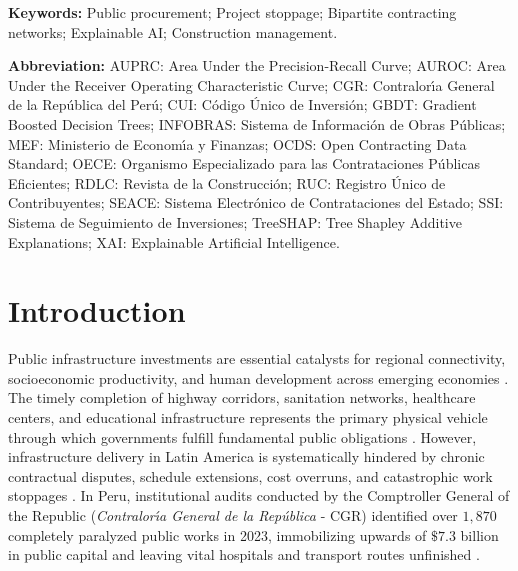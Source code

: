 \documentclass[10pt,a4paper]{article}
\begin{document}
\noindent\textbf{Keywords:} Public procurement; Project stoppage; Bipartite contracting networks; Explainable AI; Construction management.
\vspace{0.2cm}

\noindent\textbf{Abbreviation:} AUPRC: Area Under the Precision-Recall Curve; AUROC: Area Under the Receiver Operating Characteristic Curve; CGR: Contralor{\'\i}a General de la Rep{\'u}blica del Per{\'u}; CUI: C{\'o}digo {\'U}nico de Inversi{\'o}n; GBDT: Gradient Boosted Decision Trees; INFOBRAS: Sistema de Informaci{\'o}n de Obras P{\'u}blicas; MEF: Ministerio de Econom{\'\i}a y Finanzas; OCDS: Open Contracting Data Standard; OECE: Organismo Especializado para las Contrataciones P{\'u}blicas Eficientes; RDLC: Revista de la Construcci{\'o}n; RUC: Registro {\'U}nico de Contribuyentes; SEACE: Sistema Electr{\'o}nico de Contrataciones del Estado; SSI: Sistema de Seguimiento de Inversiones; TreeSHAP: Tree Shapley Additive Explanations; XAI: Explainable Artificial Intelligence.

\section*{Introduction}
Public infrastructure investments are essential catalysts for regional connectivity, socioeconomic productivity, and human development across emerging economies \citep{love2014rethinking, forcael2011design}. The timely completion of highway corridors, sanitation networks, healthcare centers, and educational infrastructure represents the primary physical vehicle through which governments fulfill fundamental public obligations \citep{alhazmi2000project, worldbank2020procurement}. However, infrastructure delivery in Latin America is systematically hindered by chronic contractual disputes, schedule extensions, cost overruns, and catastrophic work stoppages \citep{flyvbjerg2002underestimating, flyvbjerg2014what, love2018cost}. In Peru, institutional audits conducted by the Comptroller General of the Republic (\textit{Contralor{\'\i}a General de la Rep{\'u}blica} - CGR) identified over $1,870$ completely paralyzed public works in 2023, immobilizing upwards of $\$7.3$ billion in public capital and leaving vital hospitals and transport routes unfinished \citep{contraloria2023reporte}.
\end{document}
